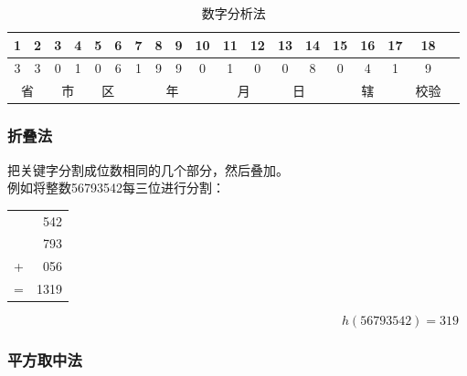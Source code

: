 \begin{table}[H]
	\centering
	\begin{tabular}{|c|c|c|c|c|c|c|c|c|c|c|c|c|c|c|c|c|c|c|}
		\hline
		\textbf{1}               & \textbf{2}               & \textbf{3}               & \textbf{4}               & \textbf{5}               & \textbf{6}               & \textbf{7}               & \textbf{8} & \textbf{9} & \textbf{10} & \textbf{11} & \textbf{12} & \textbf{13} & \textbf{14} & \textbf{15} & \textbf{16} & \textbf{17} & \textbf{18} \\
		\hline
		3                        & 3                        & 0                        & 1                        & 0                        & 6                        & 1                        & 9          & 9          & 0           & 1           & 0           & 0           & 8           & 0           & 4           & 1           & 9           \\
		\hline
		\multicolumn{2}{|c|}{省} & \multicolumn{2}{|c|}{市} & \multicolumn{2}{|c|}{区} & \multicolumn{4}{|c|}{年} & \multicolumn{2}{|c|}{月} & \multicolumn{2}{|c|}{日} & \multicolumn{3}{|c|}{辖} & 校验                                                                                                                                                  \\
		\hline
	\end{tabular}
	\caption{数字分析法}
\end{table}

\subsubsection{折叠法}

把关键字分割成位数相同的几个部分，然后叠加。\\

例如将整数56793542每三位进行分割：

\begin{table}[H]
	\centering
	\begin{tabular}{cD{.}{.}{3}}
		  & 542  \\
		  & 793  \\
		+ & 056  \\
		\hline
		= & 1319
	\end{tabular}
\end{table}

\vspace{-1cm}

$$
	h(56793542) = 319
$$

\subsubsection{平方取中法}


